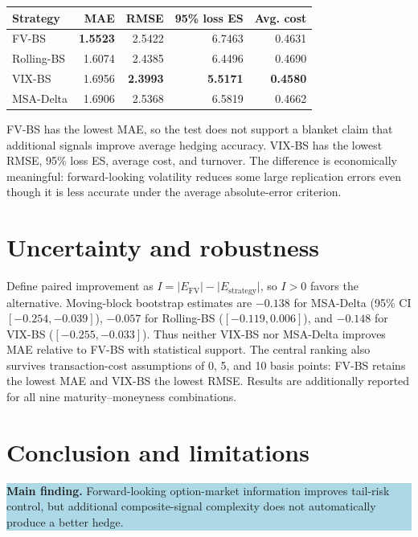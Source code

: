 \documentclass[10pt]{article}
\begin{document}
\begin{center}
\renewcommand{\arraystretch}{1.13}
\begin{tabular}{lrrrr}
\toprule
\textbf{Strategy} & \textbf{MAE} & \textbf{RMSE} & \textbf{95\% loss ES}
& \textbf{Avg. cost} \\
\midrule
FV-BS      & \textbf{1.5523} & 2.5422 & 6.7463 & 0.4631 \\
Rolling-BS & 1.6074 & 2.4385 & 6.4496 & 0.4690 \\
VIX-BS     & 1.6956 & \textbf{2.3993} & \textbf{5.5171} & \textbf{0.4580} \\
MSA-Delta  & 1.6906 & 2.5368 & 6.5819 & 0.4662 \\
\bottomrule
\end{tabular}
\end{center}

FV-BS has the lowest MAE, so the test does not support a blanket claim that
additional signals improve average hedging accuracy. VIX-BS has the lowest
RMSE, 95\% loss ES, average cost, and turnover. The difference is economically
meaningful: forward-looking volatility reduces some large replication errors
even though it is less accurate under the average absolute-error criterion.

\section{Uncertainty and robustness}

Define paired improvement as
$I=\lvert E_{\mathrm{FV}}\rvert-\lvert E_{\mathrm{strategy}}\rvert$, so
$I>0$ favors the alternative. Moving-block bootstrap estimates are $-0.138$
for MSA-Delta (95\% CI $[-0.254,-0.039]$), $-0.057$ for Rolling-BS
($[-0.119,0.006]$), and $-0.148$ for VIX-BS ($[-0.255,-0.033]$). Thus neither
VIX-BS nor MSA-Delta improves MAE relative to FV-BS with statistical support.
The central ranking also survives transaction-cost assumptions of 0, 5, and 10
basis points: FV-BS retains the lowest MAE and VIX-BS the lowest RMSE. Results
are additionally reported for all nine maturity--moneyness combinations.

\section{Conclusion and limitations}

\colorbox{lightblue}{\parbox{0.965\linewidth}{%
\textbf{Main finding.} Forward-looking option-market information improves
tail-risk control, but additional composite-signal complexity does not
automatically produce a better hedge.}}
\end{document}
